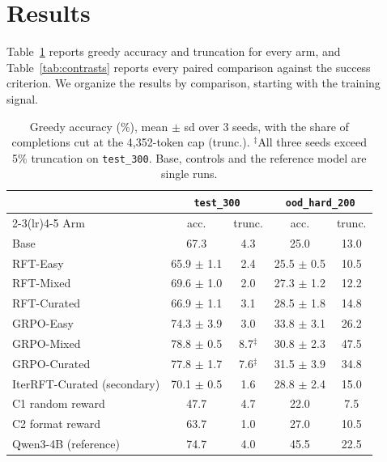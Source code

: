 \documentclass{article}
\begin{document}
\section{Results}
\label{sec:results}

Table~\ref{tab:main} reports greedy accuracy and truncation for every arm, and Table~\ref{tab:contrasts} reports every paired comparison against the success criterion. We organize the results by comparison, starting with the training signal.

\begin{table}[t]
\centering\small
\caption{Greedy accuracy (\%), mean $\pm$ sd over 3 seeds, with the share of completions cut at the 4{,}352-token cap (trunc.). $^\ddagger$All three seeds exceed 5\% truncation on \texttt{test\_300}. Base, controls and the reference model are single runs.}
\label{tab:main}
\begin{tabular}{lcccc}
\toprule
 & \multicolumn{2}{c}{\texttt{test\_300}} & \multicolumn{2}{c}{\texttt{ood\_hard\_200}} \\
\cmidrule(lr){2-3}\cmidrule(lr){4-5}
Arm & acc. & trunc. & acc. & trunc. \\
\midrule
Base                  & 67.3            & 4.3  & 25.0            & 13.0 \\
RFT-Easy              & 65.9 $\pm$ 1.1  & 2.4  & 25.5 $\pm$ 0.5  & 10.5 \\
RFT-Mixed             & 69.6 $\pm$ 1.0  & 2.0  & 27.3 $\pm$ 1.2  & 12.2 \\
RFT-Curated           & 66.9 $\pm$ 1.1  & 3.1  & 28.5 $\pm$ 1.8  & 14.8 \\
GRPO-Easy             & 74.3 $\pm$ 3.9  & 3.0  & 33.8 $\pm$ 3.1  & 26.2 \\
GRPO-Mixed            & 78.8 $\pm$ 0.5  & 8.7$^\ddagger$ & 30.8 $\pm$ 2.3 & 47.5 \\
GRPO-Curated          & 77.8 $\pm$ 1.7  & 7.6$^\ddagger$ & 31.5 $\pm$ 3.9 & 34.8 \\
\midrule
IterRFT-Curated (secondary) & 70.1 $\pm$ 0.5 & 1.6 & 28.8 $\pm$ 2.4 & 15.0 \\
C1 random reward      & 47.7            & 4.7  & 22.0            & 7.5  \\
C2 format reward      & 63.7            & 1.0  & 27.0            & 10.5 \\
\midrule
Qwen3-4B (reference)  & 74.7            & 4.0  & 45.5            & 22.5 \\
\bottomrule
\end{tabular}
\end{table}
\end{document}
